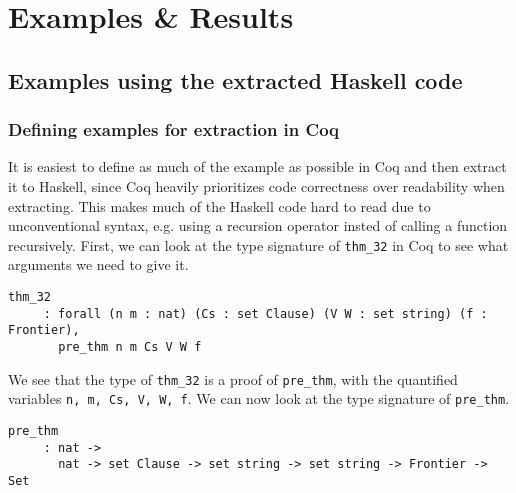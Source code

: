 \chapter{Examples \& Results}
\label{chap:examples_results}

\section{Examples using the extracted Haskell code}
\label{sec:examples}

\subsection{Defining examples for extraction in Coq}
\label{sec:defining_examples}

It is easiest to define as much of the example as possible in Coq and then extract it to Haskell,
since Coq heavily prioritizes code correctness over readability when extracting.
This makes much of the Haskell code hard to read due to unconventional syntax,
e.g. using a recursion operator insted of calling a function recursively.
First, we can look at the type signature of \lstinline{thm_32} in Coq to see what arguments we need to give it.

\begin{minipage}{\linewidth}
\begin{lstlisting}[language=Coq, label={lst:thm_32_type_sig_coq}, caption={Type signature of \lstinline{thm_32} in Coq}]
thm_32
     : forall (n m : nat) (Cs : set Clause) (V W : set string) (f : Frontier),
       pre_thm n m Cs V W f
\end{lstlisting}
\end{minipage}

We see that the type of \lstinline{thm_32} is a proof of \lstinline{pre_thm}, with the quantified variables
\lstinline{n, m, Cs, V, W, f}.
We can now look at the type signature of \lstinline{pre_thm}.

\begin{minipage}{\linewidth}
\begin{lstlisting}[language=Coq, label={lst:pre_thm_type_sig_coq}, caption={Type signature of \lstinline{pre_thm} in Coq}]
pre_thm
     : nat ->
       nat -> set Clause -> set string -> set string -> Frontier -> Set
\end{lstlisting}
\end{minipage}

